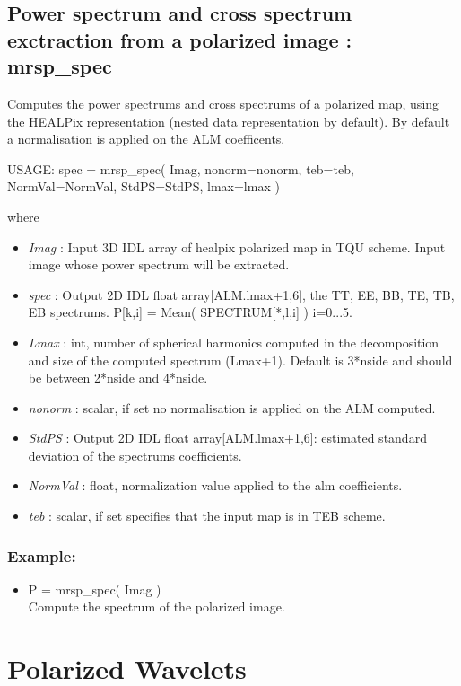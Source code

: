 \subsection{Power spectrum and cross spectrum exctraction from a polarized image : mrsp\_spec}
Computes the power spectrums and cross spectrums of a polarized map, using the HEALPix representation (nested data representation by default). 
By default a normalisation is applied on the ALM coefficents.
{\bf
\begin{center}
     USAGE: spec = mrsp\_spec( Imag, nonorm=nonorm, teb=teb, NormVal=NormVal, StdPS=StdPS, lmax=lmax )
\end{center}}
where
\begin{itemize}
\item {\em Imag} : Input 3D IDL array of healpix polarized map in TQU scheme. Input image whose power spectrum will be extracted.
\item {\em spec} : Output 2D IDL float array[ALM.lmax+1,6], the TT, EE, BB, TE, TB, EB spectrums. P[k,i] = Mean( SPECTRUM[*,l,i] ) \quad i=0...5.
\item {\em Lmax} : int, number of spherical harmonics computed in the decomposition and size of the computed spectrum (Lmax+1). Default is 3*nside and should be between 2*nside and 4*nside.
\item {\em nonorm} : scalar, if set no normalisation is applied on the ALM computed.
\item {\em StdPS} : Output 2D IDL float array[ALM.lmax+1,6]: estimated standard deviation of the spectrums coefficients.
\item {\em NormVal} : float, normalization value applied to the alm coefficients.
\item {\em teb} : scalar, if set specifies that the input map is in TEB scheme.
\end{itemize}

\subsubsection*{Example:} 
\begin{itemize}
\item P = mrsp\_spec( Imag ) \\
Compute the spectrum of the polarized image.
\end{itemize}



\section{Polarized Wavelets}
